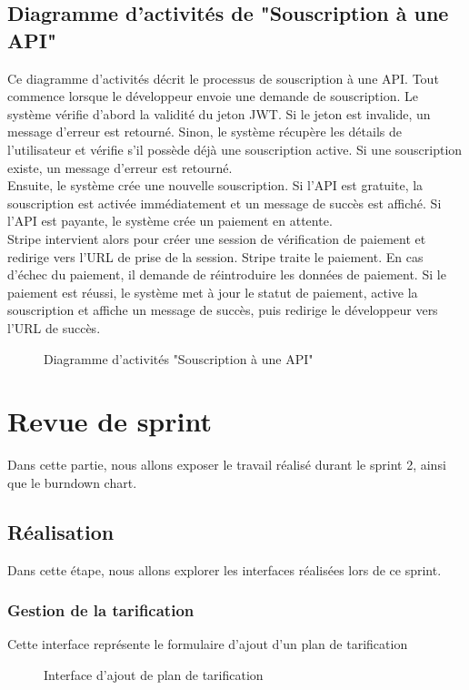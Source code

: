 \subsection{Diagramme d'activités de "Souscription à une API"} 
Ce diagramme d’activités décrit le processus de souscription à une API. Tout commence lorsque le développeur envoie une demande de souscription. Le système vérifie d’abord la validité du jeton JWT. Si le jeton est invalide, un message d’erreur est retourné.  Sinon, le système récupère les détails de l'utilisateur et vérifie s'il possède déjà une souscription active. Si une souscription existe, un message d’erreur est retourné.\\
Ensuite, le système crée une nouvelle souscription. Si l'API est gratuite, la souscription est activée immédiatement et un message de succès est affiché. Si l'API est payante, le système crée un paiement en attente. \\
Stripe intervient alors pour créer une session de vérification de paiement et redirige vers l'URL de prise de la session. Stripe traite le paiement. En cas d'échec du paiement, il demande de réintroduire les données de paiement. Si le paiement est réussi, le système met à jour le statut de paiement, active la souscription et affiche un message de succès, puis redirige le développeur vers l'URL de succès. \\
\begin{figure}[H]
    \centering
    \caption{Diagramme d'activités "Souscription à une API" }
    \label{fig:logo_tt}
\end{figure}
\pagebreak

\section{Revue de sprint}
Dans cette partie, nous allons exposer le travail réalisé durant le sprint 2, ainsi que le burndown chart.
    \subsection{Réalisation}
    Dans cette étape, nous allons explorer les interfaces réalisées lors de ce sprint.
   
    \subsubsection{Gestion de la tarification}
    Cette interface représente le formulaire d'ajout d'un plan de tarification
    \begin{figure}[H]
        \centering
        \caption{ Interface d'ajout de plan de tarification }
        \label{fig:logo_tt}
    \end{figure}

